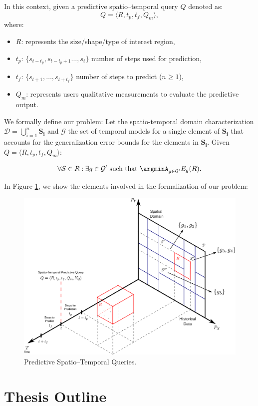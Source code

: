 \noindent In this context, given a predictive spatio--temporal query $Q$ denoted as:
\begin{equation} \label{eq:predictivequery}
Q = \langle R, t_{p}, t_{f}, Q_{m} \rangle,
\end{equation}
where:
\begin{itemize}[noitemsep,nolistsep]	
	\item $R$: represents the size/shape/type of interest region,
	\item $t_{p}$: $\{s_{t-t_p}, s_{t-t_{p}+1}\ldots, s_{t}\}$ number of steps used for  prediction,
	\item $t_{f}$: $\{s_{t+1}, \ldots, s_{t+t_f}\}$ number of steps to predict ($n\geq 1$),
	\item $Q_{m}$: represents users qualitative measurements to evaluate the predictive output.
\end{itemize}

We formally define our problem: Let the spatio-temporal domain characterization $\mathcal{D} = \bigcup_{i=1}^{n} \mathbf{S_i}$ and $\mathcal{G}$ the set of temporal models for a single element of $\mathbf{S_i}$ that accounts for the generalization error bounds for the elements in $\mathbf{S_i}$. Given $Q = \langle R, t_{p}, t_{f}, Q_{m} \rangle$:

\begin{equation}
\forall \mathcal{S} \in R: \exists g \in \mathcal{G'} \,\,\textrm{such that} \,\, \argminA_{g\in\mathcal{G'}} E_{g}(R).
\end{equation}

\noindent In Figure \ref{fig:time-series}, we show the elements involved in the formalization of our problem:
\begin{figure}[htb]
	\centering
	\includegraphics[scale=0.25]{../Figures/RepresentationTimeSeries}
	\caption{Predictive Spatio--Temporal Queries.}
	\label{fig:time-series}
\end{figure}


\section{Thesis Outline}
\label{Sec:ThesisOutline}
